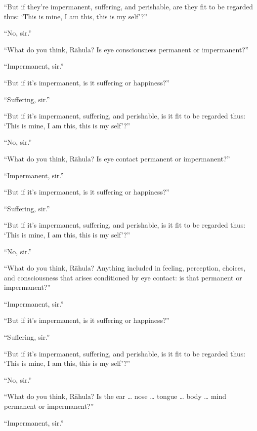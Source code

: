 \documentclass[12pt,openany]{book}%
\begin{document}
“But if they're impermanent, suffering, and perishable, are they fit to be regarded thus: ‘This is mine, I am this, this is my self’?” 

“No, sir.” 

“What do you think, \textsanskrit{Rāhula}? Is eye consciousness permanent or impermanent?” 

“Impermanent, sir.” 

“But if it’s impermanent, is it suffering or happiness?” 

“Suffering, sir.” 

“But if it’s impermanent, suffering, and perishable, is it fit to be regarded thus: ‘This is mine, I am this, this is my self’?” 

“No, sir.” 

“What do you think, \textsanskrit{Rāhula}? Is eye contact permanent or impermanent?” 

“Impermanent, sir.” 

“But if it’s impermanent, is it suffering or happiness?” 

“Suffering, sir.” 

“But if it’s impermanent, suffering, and perishable, is it fit to be regarded thus: ‘This is mine, I am this, this is my self’?” 

“No, sir.” 

“What do you think, \textsanskrit{Rāhula}? Anything included in feeling, perception, choices, and consciousness that arises conditioned by eye contact: is that permanent or impermanent?” 

“Impermanent, sir.” 

“But if it’s impermanent, is it suffering or happiness?” 

“Suffering, sir.” 

“But if it’s impermanent, suffering, and perishable, is it fit to be regarded thus: ‘This is mine, I am this, this is my self’?” 

“No, sir.” 

“What do you think, \textsanskrit{Rāhula}? Is the ear … nose … tongue … body … mind permanent or impermanent?” 

“Impermanent, sir.” 
\end{document}
